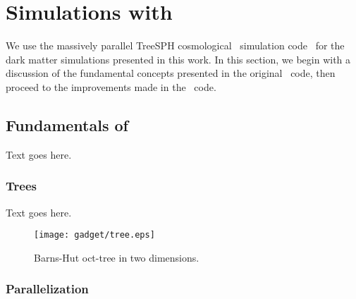 
%
%

\section{Simulations with \gadgettwo}
\label{sec:gadget}



We use the massively parallel TreeSPH cosmological \nbody\ simulation code \gadgettwo\ for the dark matter simulations presented in this work.  In this section, we begin with a discussion of the fundamental concepts presented in the original \gadget\ code, then proceed to the improvements made in the \gadgettwo\ code.




\subsection{Fundamentals of \gadget}
\label{subsec:gadget--gadget}


Text goes here.



\subsubsection{Trees}
\label{subsubsec:gadget--gadget--trees}


Text goes here.

\begin{figure}[t]
	\centering
	\texttt{[image: gadget/tree.eps]}
	\caption[Barns-Hut oct-tree in two dimensions.]{Barns-Hut oct-tree in two dimensions.}
	\label{fig:gadget--tree}
\end{figure}



\subsubsection{Parallelization}
\label{subsubsec:gadget--gadget--parallelization}


